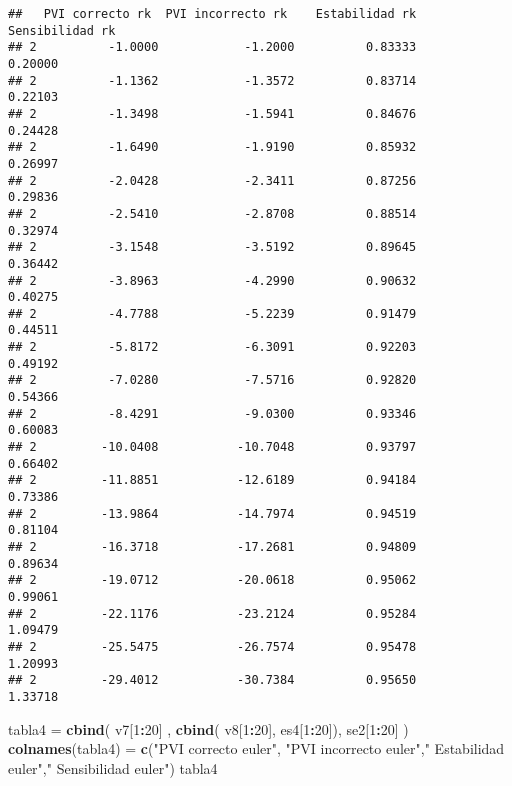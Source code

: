\documentclass[]{article}
\newenvironment{Shaded}{\begin{snugshade}}{\end{snugshade}}
\newcommand{\KeywordTok}[1]{\textcolor[rgb]{0.13,0.29,0.53}{\textbf{#1}}}
\newcommand{\DecValTok}[1]{\textcolor[rgb]{0.00,0.00,0.81}{#1}}
\newcommand{\StringTok}[1]{\textcolor[rgb]{0.31,0.60,0.02}{#1}}
\newcommand{\OperatorTok}[1]{\textcolor[rgb]{0.81,0.36,0.00}{\textbf{#1}}}
\newcommand{\NormalTok}[1]{#1}
\begin{document}
\begin{verbatim}
##   PVI correcto rk  PVI incorrecto rk    Estabilidad rk   Sensibilidad rk
## 2          -1.0000            -1.2000          0.83333           0.20000
## 2          -1.1362            -1.3572          0.83714           0.22103
## 2          -1.3498            -1.5941          0.84676           0.24428
## 2          -1.6490            -1.9190          0.85932           0.26997
## 2          -2.0428            -2.3411          0.87256           0.29836
## 2          -2.5410            -2.8708          0.88514           0.32974
## 2          -3.1548            -3.5192          0.89645           0.36442
## 2          -3.8963            -4.2990          0.90632           0.40275
## 2          -4.7788            -5.2239          0.91479           0.44511
## 2          -5.8172            -6.3091          0.92203           0.49192
## 2          -7.0280            -7.5716          0.92820           0.54366
## 2          -8.4291            -9.0300          0.93346           0.60083
## 2         -10.0408           -10.7048          0.93797           0.66402
## 2         -11.8851           -12.6189          0.94184           0.73386
## 2         -13.9864           -14.7974          0.94519           0.81104
## 2         -16.3718           -17.2681          0.94809           0.89634
## 2         -19.0712           -20.0618          0.95062           0.99061
## 2         -22.1176           -23.2124          0.95284           1.09479
## 2         -25.5475           -26.7574          0.95478           1.20993
## 2         -29.4012           -30.7384          0.95650           1.33718
\end{verbatim}

\begin{Shaded}
\begin{Highlighting}[]
\NormalTok{tabla4 =}\StringTok{ }\KeywordTok{cbind}\NormalTok{( v7[}\DecValTok{1}\OperatorTok{:}\DecValTok{20}\NormalTok{] , }\KeywordTok{cbind}\NormalTok{( v8[}\DecValTok{1}\OperatorTok{:}\DecValTok{20}\NormalTok{], es4[}\DecValTok{1}\OperatorTok{:}\DecValTok{20}\NormalTok{]), se2[}\DecValTok{1}\OperatorTok{:}\DecValTok{20}\NormalTok{] )}
\KeywordTok{colnames}\NormalTok{(tabla4) =}\StringTok{ }\KeywordTok{c}\NormalTok{(}\StringTok{"PVI correcto euler"}\NormalTok{, }\StringTok{"PVI incorrecto euler"}\NormalTok{,}\StringTok{" Estabilidad euler"}\NormalTok{,}\StringTok{" Sensibilidad euler"}\NormalTok{)}
\NormalTok{tabla4}
\end{Highlighting}
\end{Shaded}
\end{document}
